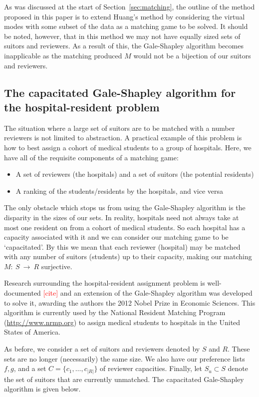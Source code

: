 As was discussed at the start of Section~\ref{sec:matching}, the outline of
the method proposed in this paper is to extend Huang's method by considering the
virtual modes with some subset of the data as a matching game to be solved. It
should be noted, however, that in this method we may not have equally sized 
sets of suitors and reviewers. As a result of this, the Gale-Shapley algorithm 
becomes inapplicable as the matching produced \(M\) would not be a bijection of 
our suitors and reviewers.

\subsection{The capacitated Gale-Shapley algorithm for the hospital-resident 
	problem}\label{subsec:capacitated_galeshapley}

The situation where a large set of suitors are to be matched with a number
reviewers is not limited to abstraction. A practical example of this problem is
how to best assign a cohort of medical students to a group of hospitals. Here, 
we have all of the requisite components of a matching game:

\begin{itemize}
	\item A set of reviewers (the hospitals) and a set of suitors (the potential
        residents) 
	\item A ranking of the students/residents by the hospitals, and vice versa
\end{itemize}

The only obstacle which stops us from using the Gale-Shapley algorithm is the 
disparity in the sizes of our sets. In reality, hospitals need not always take 
at most one resident on from a cohort of medical students. So each hospital has
a capacity associated with it and we can consider our matching game to be
`capacitated'. By this we mean that each reviewer (hospital) may be matched with
any number of suitors (students) up to their capacity, making our matching
\(M:~S~\to~R\) surjective.

Research surrounding the hospital-resident assignment problem is well-documented 
\textcolor{red}{[cite]} and an extension of the Gale-Shapley algorithm was
developed to solve it, awarding the authors the 2012 Nobel Prize in Economic
Sciences. This algorithm is currently used by the National Resident Matching
Program (\url{http://www.nrmp.org}) to assign medical students to hospitals in
the United States of America.

As before, we consider a set of suitors and reviewers denoted by \(S\) and 
\(R\). These sets are no longer (necessarily) the same size. We also have our 
preference lists \(f, g\), and a set \(C = \{c_1, \ldots, c_{|R|}\}\) of 
reviewer capacities. Finally, let \(S_u \subset S\) denote the set of suitors 
that are currently unmatched. The capacitated Gale-Shapley algorithm is given 
below.



